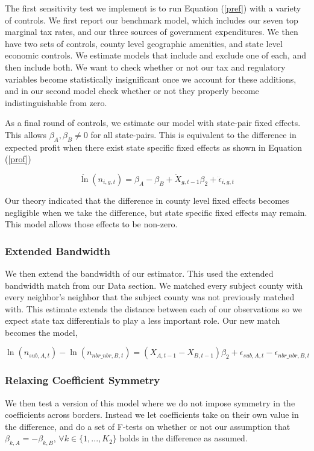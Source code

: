 The first sensitivity test we implement is to run Equation (\ref{pref}) with a variety of controls. We first report our benchmark model, which includes our seven top marginal tax rates, and our three sources of government expenditures. We then have two sets of controls, county level geographic amenities, and state level economic controls. We estimate models that include and exclude one of each, and then include both. We want to check whether or not our tax and regulatory variables become statistically insignificant once we account for these additions, and in our second model check whether or not they properly become indistinguishable from zero. 

As a final round of controls, we estimate our model with state-pair fixed effects. This allows $\beta_{A},  \beta_{B} \neq 0$ for all state-pairs. This is equivalent to the difference in expected profit when there exist state specific fixed effects as shown in Equation (\ref{prof})

\begin{equation}\label{fe}
\ddot \ln(n_{i,g,t}) = \beta_{A}-\beta_{B}+\ddot X_{g,t-1}\beta_{2} + \ddot \epsilon_{i,g,t}
\end{equation}

Our theory indicated that the difference in county level fixed effects becomes negligible when we take the difference, but state specific fixed effects may remain. This model allows those effects to be non-zero.

\subsubsection{Extended Bandwidth}

We then extend the bandwidth of our estimator. This used the extended bandwidth match from our Data section. We matched every subject county with every neighbor's neighbor that the subject county was not previously matched with. This estimate extends the distance between each of our observations so we expect state tax differentials to play a less important role. Our new match becomes the model,

\begin{equation}
\ln(n_{sub,A,t})-\ln(n_{nbr\_nbr,B,t}) = (X_{A,t-1}-X_{B,t-1})\beta_{2} + \epsilon_{sub,A,t}-\epsilon_{nbr\_nbr,B,t}
\end{equation}

\subsubsection{Relaxing Coefficient Symmetry}
We then test a version of this model where we do not impose symmetry in the coefficients across borders. Instead we let coefficients take on their own value in the difference, and do a set of F-tests on whether or not our assumption that $\beta_{k,A} = -\beta_{k,B}$, $\forall k \in \{1,...,K_{2}\}$ holds in the difference as assumed.

